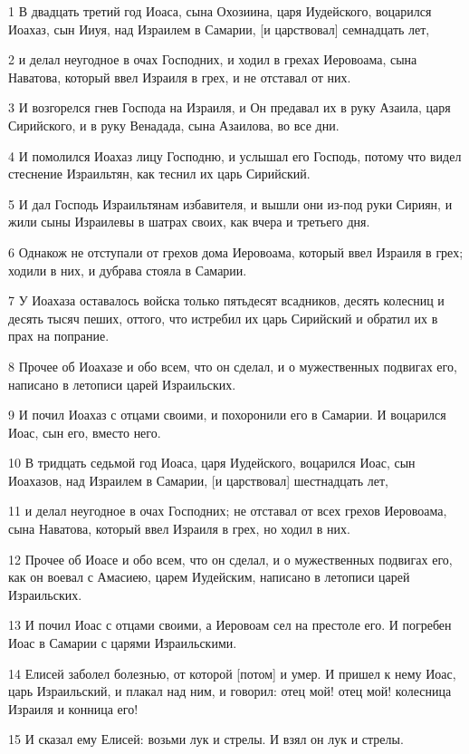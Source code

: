 \par 1 В двадцать третий год Иоаса, сына Охозиина, царя Иудейского, воцарился Иоахаз, сын Ииуя, над Израилем в Самарии, [и царствовал] семнадцать лет,
\par 2 и делал неугодное в очах Господних, и ходил в грехах Иеровоама, сына Наватова, который ввел Израиля в грех, и не отставал от них.
\par 3 И возгорелся гнев Господа на Израиля, и Он предавал их в руку Азаила, царя Сирийского, и в руку Венадада, сына Азаилова, во все дни.
\par 4 И помолился Иоахаз лицу Господню, и услышал его Господь, потому что видел стеснение Израильтян, как теснил их царь Сирийский.
\par 5 И дал Господь Израильтянам избавителя, и вышли они из-под руки Сириян, и жили сыны Израилевы в шатрах своих, как вчера и третьего дня.
\par 6 Однакож не отступали от грехов дома Иеровоама, который ввел Израиля в грех; ходили в них, и дубрава стояла в Самарии.
\par 7 У Иоахаза оставалось войска только пятьдесят всадников, десять колесниц и десять тысяч пеших, оттого, что истребил их царь Сирийский и обратил их в прах на попрание.
\par 8 Прочее об Иоахазе и обо всем, что он сделал, и о мужественных подвигах его, написано в летописи царей Израильских.
\par 9 И почил Иоахаз с отцами своими, и похоронили его в Самарии. И воцарился Иоас, сын его, вместо него.
\par 10 В тридцать седьмой год Иоаса, царя Иудейского, воцарился Иоас, сын Иоахазов, над Израилем в Самарии, [и царствовал] шестнадцать лет,
\par 11 и делал неугодное в очах Господних; не отставал от всех грехов Иеровоама, сына Наватова, который ввел Израиля в грех, но ходил в них.
\par 12 Прочее об Иоасе и обо всем, что он сделал, и о мужественных подвигах его, как он воевал с Амасиею, царем Иудейским, написано в летописи царей Израильских.
\par 13 И почил Иоас с отцами своими, а Иеровоам сел на престоле его. И погребен Иоас в Самарии с царями Израильскими.
\par 14 Елисей заболел болезнью, от которой [потом] и умер. И пришел к нему Иоас, царь Израильский, и плакал над ним, и говорил: отец мой! отец мой! колесница Израиля и конница его!
\par 15 И сказал ему Елисей: возьми лук и стрелы. И взял он лук и стрелы.
